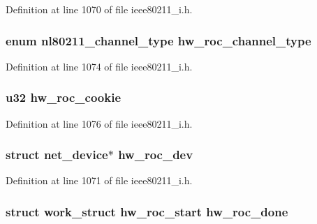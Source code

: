 Definition at line 1070 of file ieee80211\-\_\-i.\-h.

\hypertarget{structieee80211__local_a9b00b6c7042a2ae7a8ad5490f4017efa}{
\subsubsection[{hw\-\_\-roc\-\_\-channel\-\_\-type}]{\setlength{\rightskip}{0pt plus 5cm}enum nl80211\-\_\-channel\-\_\-type hw\-\_\-roc\-\_\-channel\-\_\-type}}\label{structieee80211__local_a9b00b6c7042a2ae7a8ad5490f4017efa}


Definition at line 1074 of file ieee80211\-\_\-i.\-h.

\hypertarget{structieee80211__local_af36d3ae3e1d2447d84f160e433e5be2e}{
\subsubsection[{hw\-\_\-roc\-\_\-cookie}]{\setlength{\rightskip}{0pt plus 5cm}u32 hw\-\_\-roc\-\_\-cookie}}\label{structieee80211__local_af36d3ae3e1d2447d84f160e433e5be2e}


Definition at line 1076 of file ieee80211\-\_\-i.\-h.

\hypertarget{structieee80211__local_a34d7d070a0f447d2a535599a3dff3ac5}{
\subsubsection[{hw\-\_\-roc\-\_\-dev}]{\setlength{\rightskip}{0pt plus 5cm}struct net\-\_\-device$\ast$ hw\-\_\-roc\-\_\-dev}}\label{structieee80211__local_a34d7d070a0f447d2a535599a3dff3ac5}


Definition at line 1071 of file ieee80211\-\_\-i.\-h.

\hypertarget{structieee80211__local_a471bd977ec2f7b650195b9ce384150ad}{
\subsubsection[{hw\-\_\-roc\-\_\-done}]{\setlength{\rightskip}{0pt plus 5cm}struct work\-\_\-struct hw\-\_\-roc\-\_\-start hw\-\_\-roc\-\_\-done}}\label{structieee80211__local_a471bd977ec2f7b650195b9ce384150ad}


